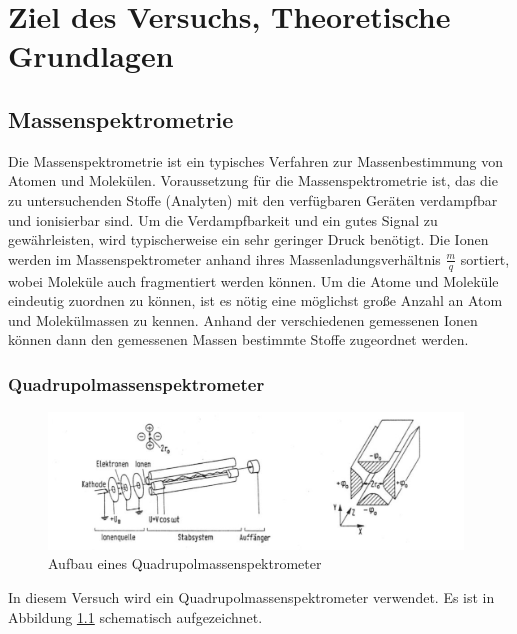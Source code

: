 \chapter{Ziel des Versuchs, Theoretische Grundlagen}
\section{Massenspektrometrie}
Die Massenspektrometrie ist ein typisches Verfahren zur Massenbestimmung von Atomen und Molekülen. Voraussetzung für die Massenspektrometrie ist, das die zu untersuchenden Stoffe (Analyten) mit den verfügbaren Geräten verdampfbar und ionisierbar sind. Um die Verdampfbarkeit und ein gutes Signal zu gewährleisten, wird typischerweise ein sehr geringer Druck benötigt. Die Ionen werden im Massenspektrometer anhand ihres Massenladungsverhältnis $\frac{m}{q}$ sortiert, wobei Moleküle auch fragmentiert werden können. Um die Atome und Moleküle eindeutig zuordnen zu können, ist es nötig eine möglichst große Anzahl an Atom und Molekülmassen zu kennen. Anhand der verschiedenen gemessenen Ionen können dann den gemessenen Massen bestimmte Stoffe zugeordnet werden. 
\subsection{Quadrupolmassenspektrometer}
\label{chapter:QMS}
\begin{figure}
    \centering
    \includegraphics[width=110mm,scale=0.5]{Massenspektrometer/include/quadrupolms.png}
    \caption{Aufbau eines Quadrupolmassenspektrometer \cite{VorbereitungsMappe}}
    \label{fig:quadrupolms}
\end{figure}
In diesem Versuch wird ein Quadrupolmassenspektrometer verwendet. Es ist in Abbildung \ref{fig:quadrupolms} schematisch aufgezeichnet. 

